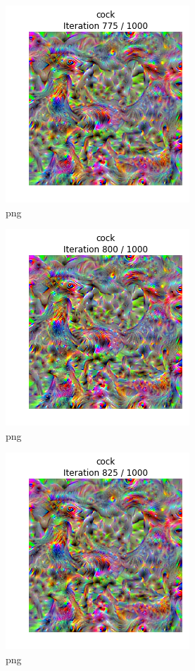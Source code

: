 \documentclass[]{book}
\theoremstyle{definition}
\theoremstyle{definition}
\theoremstyle{definition}
\theoremstyle{remark}
\begin{document}
\begin{figure}
\centering
\includegraphics{Network-Visualization-TensorFlow_files/Network-Visualization-TensorFlow_22_31.png}
\caption{png}
\end{figure}

\begin{figure}
\centering
\includegraphics{Network-Visualization-TensorFlow_files/Network-Visualization-TensorFlow_22_32.png}
\caption{png}
\end{figure}

\begin{figure}
\centering
\includegraphics{Network-Visualization-TensorFlow_files/Network-Visualization-TensorFlow_22_33.png}
\caption{png}
\end{figure}
\end{document}
